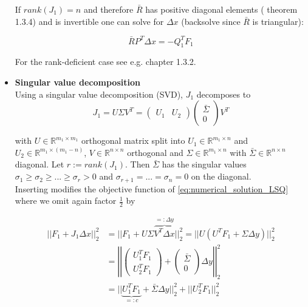 \documentclass{scrartcl}[12pt, halfparskip]
\numberwithin{equation}{section}
\numberwithin{figure}{section}
\numberwithin{table}{section}
\begin{document}
\begin{itemize}
	If $rank(J_1)=n$ and therefore $\bar{R}$ has positive diagonal elements (\cite{numerical_methods_lsq_Bjorck} theorem 1.3.4) and is invertible  one can solve for $\Delta x$ (backsolve since $\bar{R}$ is triangular):
	
	\begin{equation}
		\bar{R} P^T \Delta x = -Q_1^T F_1
	\end{equation}
	
	For the rank-deficient case see e.g. \cite{numerical_methods_lsq_Bjorck} chapter 1.3.2.
		
		
		
	\item \textbf{Singular value decomposition} \\
	Using a singular value decomposition (SVD), $J_1$ decomposes to
	\begin{equation}
		J_1 = U \Sigma V^T =
		\begin{pmatrix}
			U_1 & U_2
		\end{pmatrix}
		\begin{pmatrix}
			\bar{\Sigma} \\
			0
		\end{pmatrix}
			V^T
	\end{equation}
	
	with $U \in \mathbb{R}^{m_1 \times m_1}$ orthogonal matrix split into $U_1 \in \mathbb{R}^{m_1 \times n}$ and $U_2 \in \mathbb{R}^{m_1 \times (m_1 - n)}$, $V \in \mathbb{R}^{n \times n}$ orthogonal and $\Sigma \in \mathbb{R}^{m_1 \times n}$ with $\bar{\Sigma} \in \mathbb{R}^{n \times n}$ diagonal. Let $r := rank(J_1)$. Then $\bar{\Sigma}$ has the singular values $\sigma_1 \ge \sigma_2 \ge ... \ge \sigma_r > 0$ and $\sigma_{r+1}=...=\sigma_{n} = 0$ on the diagonal. \\
	Inserting modifies the objective function of \cref{eq:numerical_solution_LSQ} where we omit again factor $\frac{1}{2}$ by
	
	\begin{align}
		|| F_1 + J_1 \Delta x ||_2^2 & = || F_1 + U \Sigma \overbrace{V^T \Delta x}^{=: \Delta y} ||_2^2 = || U ( U^T F_1 + \Sigma \Delta y ) ||_2^2 \label{eq:numerical_solution_LSQ_SVD} \\
		& = \left| \left| \begin{pmatrix}
		U_1^T F_1 \\
		U_2^T F_1
		\end{pmatrix} + 
		\begin{pmatrix}
		\bar{\Sigma} \\
		0
		\end{pmatrix}
		\Delta y \right| \right|_2^2 \nonumber \\
		& = || \underbrace{U_1^T F_1}_{=: c} + \bar{\Sigma} \Delta y ||_2^2 + || U_2^T F_1 ||_2^2 \nonumber
	\end{align}
	

\end{itemize}
\end{document}
